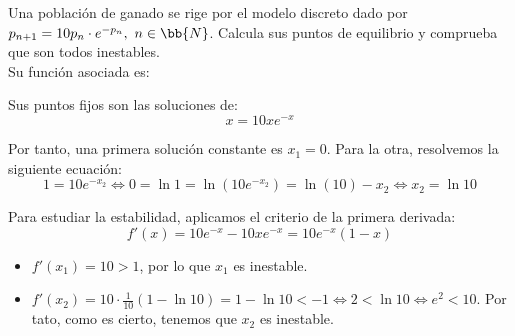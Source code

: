 \begin{ejercicio}\label{ej:2.3}
    Una población de ganado se rige por el modelo discreto dado por $p_{n+1}=10p_n\cdot e^{-p_n},~n\in \bb{N}$. Calcula sus puntos de equilibrio y comprueba que son todos inestables.\\

    Su función asociada es:

    Sus puntos fijos son las soluciones de:
    \begin{equation*}
        x = 10xe^{-x}
    \end{equation*}

    Por tanto, una primera solución constante es $x_1=0$. Para la otra, resolvemos la siguiente ecuación:
    \begin{equation*}
        1 = 10e^{-x_2} \Longleftrightarrow
        0=\ln 1 = \ln(10e^{-x_2}) = \ln(10)-x_2 \Longleftrightarrow
        x_2 = \ln 10
    \end{equation*}

    Para estudiar la estabilidad, aplicamos el criterio de la primera derivada:
    \begin{equation*}
        f'(x)=10e^{-x}-10xe^{-x} = 10e^{-x}(1-x)
    \end{equation*}
    \begin{itemize}
        \item $f'(x_1)=10>1$, por lo que $x_1$ es inestable.
        \item $f'(x_2)=10\cdot \frac{1}{10}(1-\ln 10) = 1-\ln 10<-1 \Longleftrightarrow 2<\ln 10 \Longleftrightarrow e^2 < 10$. Por tato, como es cierto, tenemos que $x_2$ es inestable.
    \end{itemize}
\end{ejercicio}


